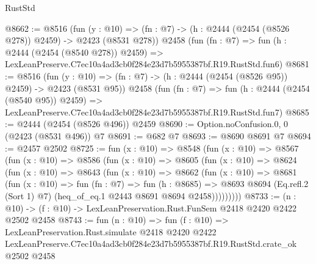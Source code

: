 \begin{lexlean}{RustStd}
\begin{coremodule}
@8662 := @8516
    (fun (y : @10) => (fn : @7) -> (h : @2444 (@2454 (@8526 @278)) @2459) -> @2423 (@8531 @278))
    @2458
    (fun (fn : @7) =>
    fun (h : @2444 (@2454 (@8540 @278)) @2459) =>
    LexLeanPreserve.C7ec10a4ad3cb0f284e23d7b5955387bf.R19.RustStd.fun6)
@8681 := @8516
    (fun (y : @10) => (fn : @7) -> (h : @2444 (@2454 (@8526 @95)) @2459) -> @2423 (@8531 @95))
    @2458
    (fun (fn : @7) =>
    fun (h : @2444 (@2454 (@8540 @95)) @2459) =>
    LexLeanPreserve.C7ec10a4ad3cb0f284e23d7b5955387bf.R19.RustStd.fun7)
@8685 := @2444 (@2454 (@8526 @496)) @2459
@8690 := Option.noConfusion.{0, 0} (@2423 (@8531 @496)) @7
@8691 := @682 @7
@8693 := @8690 @8691 @7
@8694 := @2457 @2502
@8725 := fun (x : @10) =>
  @8548
    (fun (x : @10) =>
    @8567
      (fun (x : @10) =>
      @8586
        (fun (x : @10) =>
        @8605
          (fun (x : @10) =>
          @8624
            (fun (x : @10) =>
            @8643
              (fun (x : @10) =>
              @8662
                (fun (x : @10) =>
                @8681
                  (fun (x : @10) =>
                  fun (fn : @7) =>
                  fun (h : @8685) =>
                  @8693
                    @8694
                    (Eq.refl.{2} (Sort 1) @7)
                    (heq_of_eq.{1} @2443 @8691 @8694 @2458)))))))))
@8733 := (n : @10) -> (f : @10) -> LexLeanPreservation.Rust.FunSem @2418 @2420 @2422 @2502 @2458
@8743 := fun (n : @10) =>
  fun (f : @10) =>
  LexLeanPreservation.Rust.simulate
    @2418
    @2420
    @2422
    LexLeanPreserve.C7ec10a4ad3cb0f284e23d7b5955387bf.R19.RustStd.crate_ok
    @2502
    @2458
\end{coremodule}
\end{lexlean}
